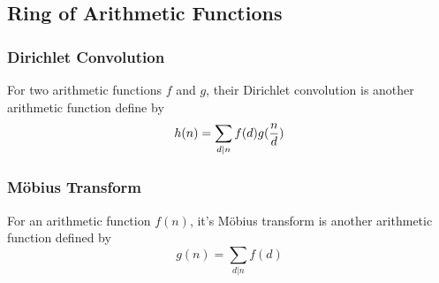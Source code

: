 \documentclass{article}
\begin{document}
\subsection{Ring of Arithmetic Functions}
\subsubsection*{Dirichlet Convolution}
For two arithmetic functions $f$ and $g$, their Dirichlet convolution is another arithmetic function
define by $$h(n) = \sum_{d \vert n} f(d) g({n \over d})$$

\subsubsection*{M\"obius Transform}
For an arithmetic function $f(n)$, it's M\"obius transform is another arithmetic function
defined by $$g(n) = \sum_{d \vert n} f(d)$$
\end{document}
